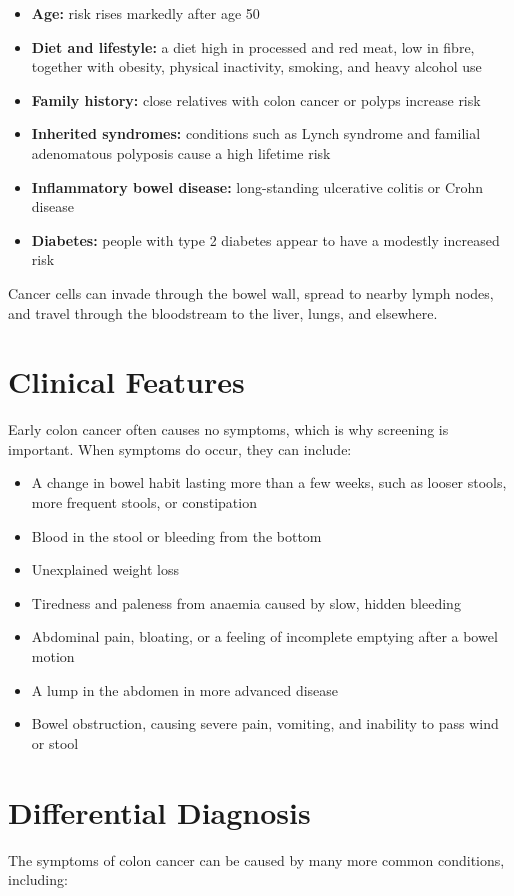 \begin{itemize}
    \item \textbf{Age:} risk rises markedly after age 50
    \item \textbf{Diet and lifestyle:} a diet high in processed and red meat, low in fibre, together with obesity, physical inactivity, smoking, and heavy alcohol use
    \item \textbf{Family history:} close relatives with colon cancer or polyps increase risk
    \item \textbf{Inherited syndromes:} conditions such as Lynch syndrome and familial adenomatous polyposis cause a high lifetime risk
    \item \textbf{Inflammatory bowel disease:} long-standing ulcerative colitis or Crohn disease
    \item \textbf{Diabetes:} people with type 2 diabetes appear to have a modestly increased risk
\end{itemize}

Cancer cells can invade through the bowel wall, spread to nearby lymph nodes, and travel through the bloodstream to the liver, lungs, and elsewhere.

\section*{Clinical Features}
Early colon cancer often causes no symptoms, which is why screening is important. When symptoms do occur, they can include:

\begin{itemize}
    \item A change in bowel habit lasting more than a few weeks, such as looser stools, more frequent stools, or constipation
    \item Blood in the stool or bleeding from the bottom
    \item Unexplained weight loss
    \item Tiredness and paleness from anaemia caused by slow, hidden bleeding
    \item Abdominal pain, bloating, or a feeling of incomplete emptying after a bowel motion
    \item A lump in the abdomen in more advanced disease
    \item Bowel obstruction, causing severe pain, vomiting, and inability to pass wind or stool
\end{itemize}

\section*{Differential Diagnosis}
The symptoms of colon cancer can be caused by many more common conditions, including:

